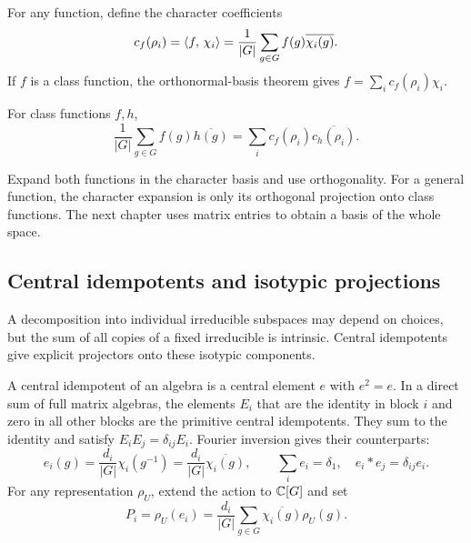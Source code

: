 For any function, define the character coefficients
\begin{equation}
\label{defn-coef-fourier-grpe-non-commutative}
 c_f(\rho_i)=\langle f,\,\chi_i\rangle=
              \frac1{|G|}\sum_{g\in G}f(g)\overline{\chi_i(g)}.
\end{equation}
If $f$ is a class function, the orthonormal-basis theorem gives
$f=\sum_i c_f(\rho_i)\chi_i$.


\begin{prop}
\label{prop-formula-floorel-representation}
For class functions $f,h$,
\[
 \frac1{|G|}\sum_{g\in G}f(g)\overline{h(g)}
       =\sum_i c_f(\rho_i)\overline{c_h(\rho_i)}.
\]
\end{prop}
Expand both functions in the character basis and use orthogonality.
For a general function, the character expansion is only its orthogonal
projection onto class functions. The next chapter uses matrix entries
to obtain a basis of the whole space.

\subsection{Central idempotents and isotypic projections}
\label{sect2-trans-fourier-et-caracteres}

A decomposition into individual irreducible subspaces may depend on choices,
but the sum of all copies of a fixed irreducible is intrinsic. Central
idempotents give explicit projectors onto these isotypic components.

A central idempotent of an algebra is a central element $e$ with $e^2=e$.
In a direct sum of full matrix algebras, the elements $E_i$ that are the
identity in block $i$ and zero in all other blocks are the primitive
central idempotents. They sum to the identity and satisfy
$E_iE_j=\delta_{ij}E_i$. Fourier inversion gives their counterparts:
\[
 e_i(g)=\frac{d_i}{|G|}\chi_i(g^{-1})
       =\frac{d_i}{|G|}\overline{\chi_i(g)},\qquad
 \sum_i e_i=\delta_1,\quad e_i*e_j=\delta_{ij}e_i.
\]
For any representation $\rho_U$, extend the action to $\mathbb{C}[G]$ and set
\[
 P_i=\rho_U(e_i)=\frac{d_i}{|G|}\sum_{g\in G}
                     \overline{\chi_i(g)}\rho_U(g).
\]


